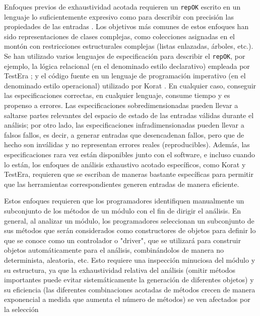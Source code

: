 Enfoques previos de exhaustividad acotada requieren un \texttt{repOK} escrito en un lenguaje lo suficientemente expresivo como para describir con precisión las propiedades de las entradas \cite{Marinov01, Boyapati02}. Los objetivos más comunes de estos enfoques han sido representaciones de clases complejas, como colecciones asignadas en el montón con restricciones estructurales complejas (listas enlazadas, árboles, etc.). Se han utilizado varios lenguajes de especificación para describir el \texttt{repOK}, por ejemplo, la lógica relacional (en el denominado estilo declarativo) empleada por \textsf{TestEra} \cite{Marinov01}; y el código fuente en un lenguaje de programación imperativo (en el denominado estilo operacional) utilizado por \textsf{Korat} \cite{Boyapati02}. En cualquier caso, conseguir las especificaciones correctas, en cualquier lenguaje, consume tiempo y es propenso a errores. Las especificaciones sobredimensionadas pueden llevar a saltarse partes relevantes del espacio de estado de las entradas válidas durante el análisis; por otro lado, las especificaciones infradimensionadas pueden llevar a falsos fallos, es decir, a generar entradas que desencadenan fallos, pero que de hecho son inválidas y no representan errores reales (reproducibles). Además, las especificaciones rara vez están disponibles junto con el software, e incluso cuando lo están, los enfoques de análisis exhaustivo acotado específicos, como \textsf{Korat} y \textsf{TestEra}, requieren que se escriban de maneras bastante específicas para permitir que las herramientas correspondientes generen entradas de manera eficiente.


Estos enfoques  requieren que los
programadores identifiquen manualmente un subconjunto de los métodos de un
módulo con el fin de dirigir el análisis. En general, al analizar un módulo,
los programadores seleccionan un subconjunto de sus métodos que serán
considerados como constructores de objetos para definir lo que
se conoce como un controlador o "driver", que se utilizará para construir
objetos automáticamente para el análisis, combinándolos de manera no
determinista, aleatoria, etc. Esto requiere una inspección minuciosa del módulo
y su estructura, ya que la exhaustividad relativa del análisis (omitir métodos
importantes puede evitar sistemáticamente la generación de diferentes objetos) y
su eficiencia (las diferentes combinaciones acotadas de métodos crecen de manera
exponencial a medida que aumenta el número de métodos) se ven afectados por la
selección 